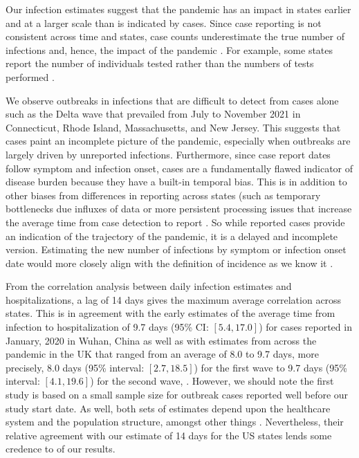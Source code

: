 \documentclass{article}
\begin{document}
Our infection estimates suggest that the pandemic has an impact
in states earlier and at a larger scale than is indicated by cases. Since
case reporting is not consistent across time and states, case counts
underestimate the true number of infections and, hence, the impact of the
pandemic \citep{cdc2022estimated, simon2022inconsistent}. For example, some
states report the number of individuals tested rather than the numbers of tests
performed \citep{schechtman2020counting, chitwood2022reconstructing}.

We observe outbreaks in infections that are difficult to detect from cases
alone such as the Delta wave that prevailed from July to November 2021 in Connecticut, 
Rhode Island, Massachusetts, and New Jersey. This suggests that cases paint an incomplete 
picture of the pandemic, especially when outbreaks are largely driven by 
unreported infections. Furthermore, since case report dates follow symptom and infection
onset, cases are a fundamentally flawed indicator of disease burden because they
have a built-in temporal bias. This is in addition to other biases from
differences in reporting across states (such as temporary bottlenecks due
influxes of data or more persistent processing issues that increase the average
time from case detection to report \citep{wash2020dash, dunkel2020covid19}. So
while reported cases provide an indication of the trajectory of the pandemic, it
is a delayed and incomplete version. Estimating the new number of infections by
symptom or infection onset date would more closely align with the definition of
incidence as we know it \citep{jahja2022real}.

From the correlation analysis between daily infection estimates and
hospitalizations, a lag of 14 days gives the maximum average correlation 
across states. This is in agreement with the early estimates of the average time from
infection to hospitalization of 9.7 days (95\% CI: $[5.4, 17.0]$) for
cases reported in January, 2020 in Wuhan, China as well as with estimates from
across the pandemic in the UK that ranged from an average of 8.0 to 9.7
days, more precisely, 8.0 days (95\% interval: $[2.7, 18.5]$) for the first
wave to 9.7 days (95\% interval: $[4.1, 19.6]$) for the second wave,
\citep{ward2021understanding}. However, we should note the first study is based
on a small sample size for outbreak cases reported well before our study start
date. As well, both sets of estimates depend upon the healthcare system and the
population structure, amongst other things \citep{ward2021understanding}.
Nevertheless, their relative agreement with our estimate of 14 days for the US
states lends some credence to of our results. 
\end{document}
